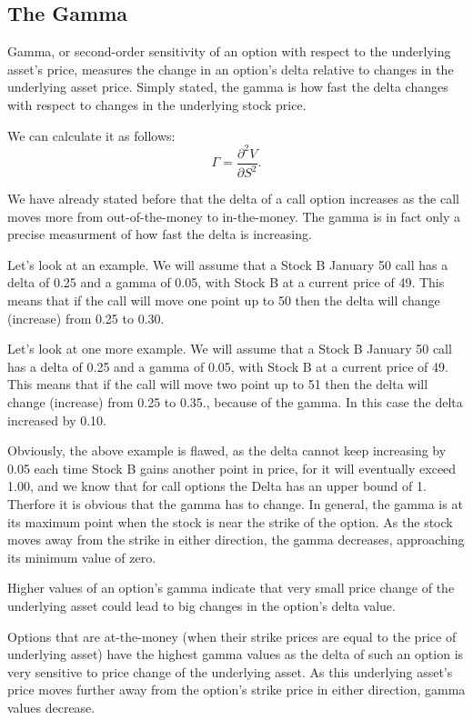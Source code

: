 \documentclass[a4paper, 12pt]{article}
\theoremstyle{definition}
\theoremstyle{plain}
\begin{document}
\subsection{The Gamma}

Gamma, or second-order sensitivity of an option 
with respect to the underlying asset's price, 
measures the change in an option's delta relative to changes 
in the underlying asset price. 
Simply stated, the gamma is how fast the delta changes with respect to changes in the
underlying stock price.

We can calculate it as follows:
$$
\Gamma = \frac{\partial^2 V}{\partial S^2}.
$$

We have already stated before that the delta of a call option 
increases as the call moves more from out-of-the-money to in-the-money.
The gamma is in fact only a precise measurment of how fast the delta is 
increasing.

Let's look at an example. We will assume that a Stock B January 50 call has a delta of 0.25
and a gamma of 0.05, with Stock B at a current price of 49. 
This means that if the call will move one point up to 50
then the delta will change (increase) from 0.25 to 0.30.

Let's look at one more example. We will assume that a Stock B January 50 call has a 
delta of 0.25 and a gamma of 0.05, with Stock B at a current price of 49. 
This means that if the call will move two point up to 51
then the delta will change (increase) from 0.25 to 0.35.,
because of the gamma.
In this case the delta increased by 0.10.

Obviously, the above example is flawed, as the
delta cannot keep increasing by 0.05 each time 
Stock B gains another point in price, for it will eventually exceed 1.00,
and we know that for call options the Delta has an upper bound of 1.
Therfore it is obvious that the gamma has to change.
In general, the gamma is at its maximum point when the stock is near the strike of the
option.
As the stock moves away from the strike in either direction, the gamma
decreases, approaching its minimum value of zero. 

Higher values of an option's gamma indicate that very small 
price change of the underlying asset could lead to 
big changes in the option's delta value.

Options that are at-the-money (when their strike prices 
are equal to the price of underlying asset) have the 
highest gamma values as the delta of such an option is 
very sensitive to price change of the underlying asset. 
As this underlying asset's price moves further away 
from the option's strike price in either direction, 
gamma values decrease. 
\end{document}

